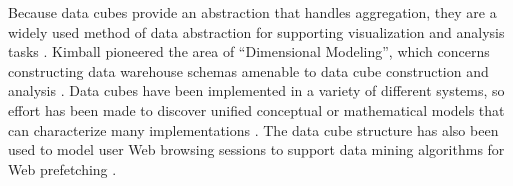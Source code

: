 \documentclass[12pt]{report}
\begin{document}
\begin{doublespace}
Because data cubes provide an abstraction that handles aggregation, they are a widely used method of data abstraction for supporting visualization and analysis tasks \cite{stolte2003multiscale}. Kimball pioneered the area of ``Dimensional Modeling'', which concerns constructing data warehouse schemas amenable to data cube construction and analysis \cite{kimball1998data}. Data cubes have been implemented in a variety of different systems, so effort has been made to discover unified conceptual or mathematical models that can characterize many implementations \cite{datta1999cube, vassiliadis1999survey, vassiliadis1998modeling, li1996data, agrawal1997modeling, gyssens1997foundation, blaschka1998finding}. The data cube structure has also been used to model user Web browsing sessions to support data mining algorithms for Web prefetching \cite{yang2003data}.
%
%

\end{doublespace}
\end{document}
